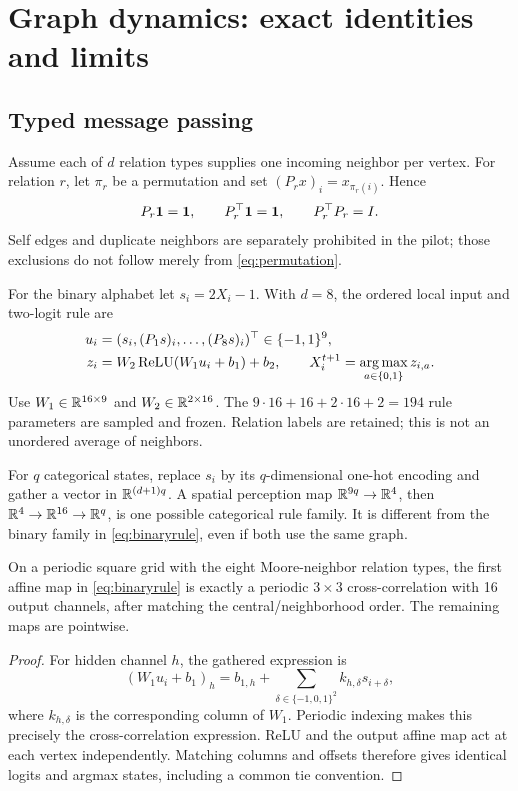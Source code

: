 \section{Graph dynamics: exact identities and limits}
\label{sec:dynamics}

\subsection{Typed message passing}

Assume each of $d$ relation types supplies one incoming neighbor per vertex.
For relation $r$, let $\pi_r$ be a permutation and set
$(P_rx)_i=x_{\pi_r(i)}$. Hence
\begin{equation}
 P_r\mathbf{1}=\mathbf{1},\qquad P_r^\top\mathbf{1}=\mathbf{1},\qquad P_r^\top P_r=I.
 \label{eq:permutation}
\end{equation}
Self edges and duplicate neighbors are separately prohibited in the pilot;
those exclusions do not follow merely from \eqref{eq:permutation}.

For the binary alphabet let $s_i=2X_i-1$. With $d=8$, the ordered local
input and two-logit rule are
\begin{align}
 u_i&=(s_i,(P_1s)_i,\ldots,(P_8s)_i)^\top\in\{-1,1\}^{9},\\
 z_i&=W_2\operatorname{ReLU}(W_1u_i+b_1)+b_2,\qquad
 X_i^{t+1}=\operatorname*{arg\,max}_{a\in\{0,1\}}z_{i,a}.
 \label{eq:binaryrule}
\end{align}
Use $W_1\in\mathbb{R}^{16\times9}$ and $W_2\in\mathbb{R}^{2\times16}$.
The $9\cdot16+16+2\cdot16+2=194$ rule parameters are sampled and frozen.
Relation labels are retained; this is not an unordered average of neighbors.

For $q$ categorical states, replace $s_i$ by its $q$-dimensional one-hot
encoding and gather a vector in $\mathbb{R}^{(d+1)q}$. A spatial perception map
$\mathbb{R}^{9q}\to\mathbb{R}^4$, then $\mathbb{R}^4\to\mathbb{R}^{16}\to\mathbb{R}^q$, is one possible
categorical rule family. It is different from the binary family in
\eqref{eq:binaryrule}, even if both use the same graph.

\begin{proposition}
\label{prop:convolution}
On a periodic square grid with the eight Moore-neighbor relation types,
the first affine map in \eqref{eq:binaryrule} is exactly a periodic
$3\times3$ cross-correlation with 16 output channels, after matching
the central/neighborhood order. The remaining maps are pointwise.
\end{proposition}
\begin{proof}
For hidden channel $h$, the gathered expression is
\[
 (W_1u_i+b_1)_h
 =b_{1,h}+\sum_{\delta\in\{-1,0,1\}^2}
                   k_{h,\delta}s_{i+\delta},
\]
where $k_{h,\delta}$ is the corresponding column of $W_1$. Periodic
indexing makes this precisely the cross-correlation expression.
ReLU and the output affine map act at each vertex independently.
Matching columns and offsets therefore gives identical logits and argmax
states, including a common tie convention.
\end{proof}

